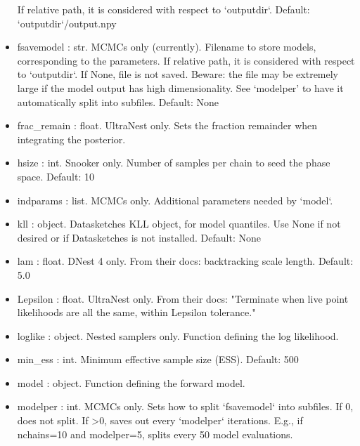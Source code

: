 \documentclass[letterpaper, 12pt]{article}
\begin{document}
\begin{itemize}
                            If relative path, it is considered with  
                            respect to `outputdir`.   
                            Default: `outputdir`/output.npy
\item fsavemodel : str. MCMCs only (currently). 
                        Filename to store models, corresponding to  
                        the parameters. If relative path, it is  
                        considered with respect to `outputdir`.   
                        If None, file is not saved.   
                        Beware: the file may be extremely large  
                        if the model output has high dimensionality. 
                        See `modelper' to have it automatically split into 
                        subfiles.
                        Default: None
\item frac\_remain : float. UltraNest only. Sets the fraction  
                            remainder when integrating the posterior.
\item hsize : int. Snooker only. Number of samples per chain to seed the 
                   phase space.  Default: 10
\item indparams : list. MCMCs only. Additional parameters needed by `model`.
\item kll : object.  Datasketches KLL object, for model quantiles.  
                     Use None if not desired or if Datasketches is  
                     not installed.  Default: None
\item lam : float. DNest 4 only. From their docs: backtracking scale 
                   length.  Default: 5.0
\item Lepsilon : float. UltraNest only. From their docs: "Terminate  
                        when live point likelihoods are all the same,  
                        within Lepsilon tolerance."
\item loglike : object. Nested samplers only.  Function defining the log 
                        likelihood.
\item min\_ess : int. Minimum effective sample size (ESS). Default: 500
\item model : object. Function defining the forward model.
\item modelper : int. MCMCs only. Sets how to split `fsavemodel` 
                      into subfiles.   
                      If 0, does not split.  If >0, saves out every  
                      `modelper` iterations.  E.g., if nchains=10 and  
                      modelper=5, splits every 50 model evaluations.   

\end{itemize}
\end{document}
